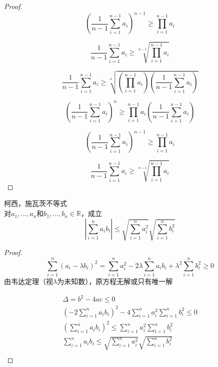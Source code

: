 \begin{proof}
\begin{equation}	
	(\frac{1}{n-1}\sum_{i=1}^{n-1}a_i)^{n-1}
	\geq \prod_{i=1}^{n-1}a_i
\end{equation}


\begin{equation}		
	\frac{1}{n-1}\sum_{i=1}^{n-1}a_i
	\geq \sqrt[n-1]{\prod_{i=1}^{n-1}a_i}
\end{equation}


\begin{equation}
	\frac{1}{n-1}\sum_{i=1}^{n-1}a_i \geq \sqrt[n]{(\prod_{i=1}^{n-1}a_i)(\frac{1}{n-1}\sum_{i=1}^{n-1}a_i)}
\end{equation}

\begin{equation}
	( \frac{1}{n-1}\sum_{i=1}^{n-1}a_i )^n \geq \prod_{i=1}^{n-1}a_i(\frac{1}{n-1}\sum_{i=1}^{n-1}a_i)
\end{equation}

\begin{equation}
	( \frac{1}{n-1}\sum_{i=1}^{n-1}a_i )^{n-1} \geq \prod_{i=1}^{n-1}a_i
\end{equation}

\begin{equation}
 \frac{1}{n-1}\sum_{i=1}^{n-1}a_i  \geq \sqrt[n-1]{\prod_{i=1}^{n-1}a_i}
\end{equation}

\end{proof}

\begin{theorem}
	柯西，施瓦茨不等式\\	
	对$ a_1,\dots,a_n $和$ b_1, \dots ,b_n \in \mathbb{R}$，成立
	\begin{equation}
		|\sum_{i=1}^n a_ib_i|\leq \sqrt{\sum_{i=1}^n a_i^2}\sqrt{\sum_{i=1}^n b_i^2}
	\end{equation}
	\label{1.3.5}
\end{theorem}
\begin{proof}
	\[ \sum_{i=1}^n (a_i - \lambda b_i)^2 = \sum_{i=1}^n a_i^2 - 2\lambda \sum_{i=1}^n a_i b_i + \lambda^2 \sum_{i=1}^n b_i^2 \geq 0  \]
	由韦达定理（视$ \lambda $为未知数），原方程无解或只有唯一解
	
	\begin{equation}
		\begin{aligned}
		 \Delta = b^2-4ac \leq 0\\
		 (-2\sum_{i=1}^n a_i b_i)^2-4\sum_{i=1}^na_i^2\sum_{i=1}^nb_i^2\leq 0\\	
		 (\sum_{i=1}^n a_i b_i)^2 \leq \sum_{i=1}^na_i^2\sum_{i=1}^nb_i^2\\
		 \sum_{i=1}^n a_i b_i \leq \sqrt{\sum_{i=1}^na_i^2}\sqrt{\sum_{i=1}^nb_i^2}\\
	 \end{aligned}
	\end{equation}
\end{proof}

